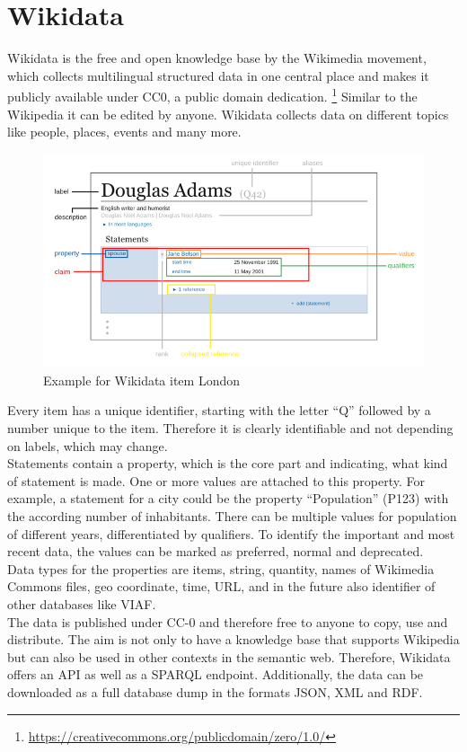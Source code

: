 \section{Wikidata}

Wikidata is the free and open knowledge base by the Wikimedia movement, which collects multilingual structured data in one central place and makes it publicly available under CC0, a public domain dedication. \footnote{\href{https://creativecommons.org/publicdomain/zero/1.0/}{https://creativecommons.org/publicdomain/zero/1.0/}} Similar to the Wikipedia it can be edited by anyone. Wikidata collects data on different topics like people, places, events and many more.
\begin{figure}[ht]
	\centering
	\includegraphics[width=150mm]{diagrams/Wikidata_statement.png}
	\caption{Example for Wikidata item London}
	\label{fig1}
\end{figure}
Every item has a unique identifier, starting with the letter ``Q'' followed by a number unique to the item. Therefore it is clearly identifiable and not depending on labels, which may change. \\
Statements contain a property, which is the core part and indicating, what kind of statement is made. One or more values are attached to this property. For example, a statement for a city could be the property ``Population'' (P123)  with the according number of inhabitants. There can be multiple values for population of different years, differentiated by qualifiers. To identify the important and most recent data, the values can be marked as preferred, normal and deprecated.\\
Data types for the properties  are items, string, quantity, names of Wikimedia Commons files, geo coordinate, time, URL,  and in the future also identifier of other databases like VIAF. \\
The data is published under CC-0 and therefore free to anyone to copy, use and distribute.
The aim is not only to have a knowledge base that supports Wikipedia but can also be used in other contexts in the semantic web. Therefore, Wikidata offers an API as well as a SPARQL endpoint. Additionally, the data can be downloaded as a full database dump in the formats JSON, XML and RDF.  